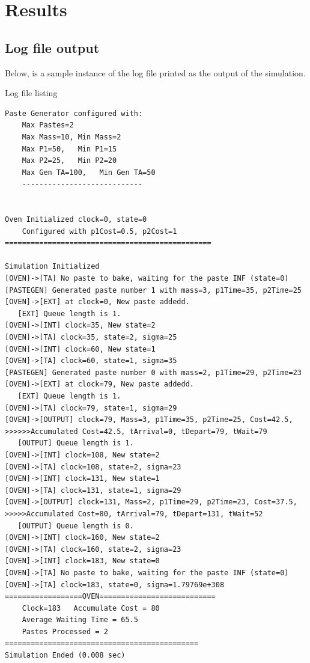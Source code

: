 \documentclass[titlepage]{report}%
\begin{document}
{\chapter{Results}

\section{Log file output}
Below, is a sample instance of the log file printed as the output of the simulation.

Log file listing
\begin{verbatim}
Paste Generator configured with:
	Max Pastes=2
	Max Mass=10, Min Mass=2
	Max P1=50,   Min P1=15
	Max P2=25,   Min P2=20
	Max Gen TA=100,   Min Gen TA=50
	----------------------------


Oven Initialized clock=0, state=0
	Configured with p1Cost=0.5, p2Cost=1
================================================

Simulation Initialized
[OVEN]->[TA] No paste to bake, waiting for the paste INF (state=0)
[PASTEGEN] Generated paste number 1 with mass=3, p1Time=35, p2Time=25
[OVEN]->[EXT] at clock=0, New paste addedd.
   [EXT] Queue length is 1.
[OVEN]->[INT] clock=35, New state=2
[OVEN]->[TA] clock=35, state=2, sigma=25
[OVEN]->[INT] clock=60, New state=1
[OVEN]->[TA] clock=60, state=1, sigma=35
[PASTEGEN] Generated paste number 0 with mass=2, p1Time=29, p2Time=23
[OVEN]->[EXT] at clock=79, New paste addedd.
   [EXT] Queue length is 1.
[OVEN]->[TA] clock=79, state=1, sigma=29
[OVEN]->[OUTPUT] clock=79, Mass=3, p1Time=35, p2Time=25, Cost=42.5, 
>>>>>>Accumulated Cost=42.5, tArrival=0, tDepart=79, tWait=79
   [OUTPUT] Queue length is 1.
[OVEN]->[INT] clock=108, New state=2
[OVEN]->[TA] clock=108, state=2, sigma=23
[OVEN]->[INT] clock=131, New state=1
[OVEN]->[TA] clock=131, state=1, sigma=29
[OVEN]->[OUTPUT] clock=131, Mass=2, p1Time=29, p2Time=23, Cost=37.5, 
>>>>>Accumulated Cost=80, tArrival=79, tDepart=131, tWait=52
   [OUTPUT] Queue length is 0.
[OVEN]->[INT] clock=160, New state=2
[OVEN]->[TA] clock=160, state=2, sigma=23
[OVEN]->[INT] clock=183, New state=0
[OVEN]->[TA] No paste to bake, waiting for the paste INF (state=0)
[OVEN]->[TA] clock=183, state=0, sigma=1.79769e+308
==================OVEN===========================
	Clock=183	Accumulate Cost = 80
	Average Waiting Time = 65.5
	Pastes Processed = 2
=============================================
Simulation Ended (0.008 sec)


\end{verbatim}}
\end{document}
